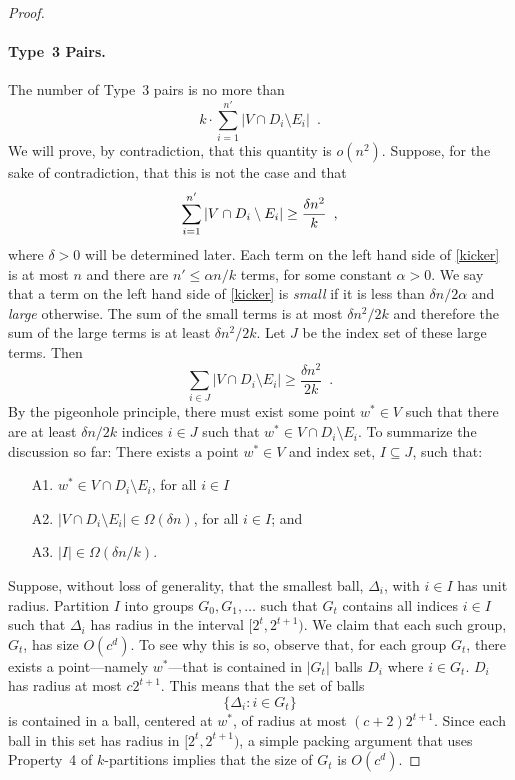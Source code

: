 \documentclass{patmorin}
\begin{document}
\begin{proof}
  \paragraph{Type~3 Pairs.}
  The number of Type~3 pairs is no more than 
  \[  
     k\cdot\sum_{i=1}^{n'}|V\cap D_i\setminus E_i| \enspace .
  \]
  We will prove, by contradiction, that this quantity is $o(n^2)$.
  Suppose, for the sake of contradiction, that this is not the case
  and that
  \begin{equation}
    \sum_{i=1}^{n'} |V\cap D_i\setminus E_i| \ge \frac{\delta n^2}{k}
         \enspace , \eqlabel{kicker}
  \end{equation}
  where $\delta>0$ will be determined later.
  Each term on the left hand side of \eqref{kicker} is at most $n$
  and there are $n'\le \alpha n/k$ terms, for some constant $\alpha
  >0$.  We say that a term on the left hand side of \eqref{kicker} is
  \emph{small} if it is less than $\delta n/2\alpha$ and \emph{large}
  otherwise.  The sum of the small terms is at most $\delta n^2/2k$
  and therefore the sum of the large terms is at least $\delta n^2/2k$.
  Let $J$ be the index set of these large terms.  Then
  \[
    \sum_{i\in J} |V\cap D_i\setminus E_i| \ge \frac{\delta n^2}{2k} \enspace .
  \]
  By the pigeonhole principle, there must exist some point $w^*\in V$
  such that there are at least $\delta n/2k$ indices $i\in J$ such that
  $w^*\in V\cap D_i\setminus E_i$.  To summarize the discussion so far:
  There exists a point $w^*\in V$ and index set, $I\subseteq J$,
  such that:
  \begin{enumerate}
     \item[A1.] $w^*\in V\cap D_{i}\setminus E_{i}$, for all
        $i\in I$
     \item[A2.] $|V\cap D_{i}\setminus E_{i}|\in \Omega(\delta n)$,
       for all $i\in I$; and
     \item[A3.] $|I|\in\Omega(\delta n/k)$.
  \end{enumerate}

  Suppose, without loss of generality, that the smallest ball,
  $\Delta_i$, with $i\in I$ has unit radius.  Partition $I$ into groups
  $G_0,G_1,\ldots$ such that $G_t$ contains all indices $i\in I$ such
  that $\Delta_{i}$ has radius in the interval $[2^t,2^{t+1})$.  We claim
  that each such group, $G_t$, has size $O(c^d)$.  To see why this is
  so, observe that, for each group $G_t$, there exists a point---namely
  $w^*$---that is contained in $|G_t|$ balls $D_{i}$ where $i\in G_t$.
  $D_{i}$ has radius at most $c2^{t+1}$.  This means that the set of balls
  \[
     \{ \Delta_i : i\in G_t\}
  \]
  is contained in a ball, centered at $w^*$, of radius at most
  $(c+2)2^{t+1}$.  Since each ball in this set has radius in
  $[2^t,2^{t+1})$, a simple packing argument that uses Property~4 of
  $k$-partitions implies that the size of $G_t$ is $O(c^d)$.


\end{proof}
\end{document}

